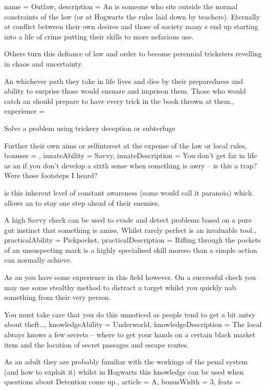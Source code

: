 \archetype
{
	name = Outlaw,
	description = An \bname{} is someone who sits outside the normal constraints of the law (or \comma{} at Hogwarts\comma{} the rules laid down by teachers). Eternally at conflict between their own desires and those of society\comma{} many \bname{}s end up starting into a life of crime\comma{} putting their skills to more nefarious use. 

Others turn this defiance of law and order to become perennial tricksters\comma{} revelling in chaos and uncertainty. 

An \bname{}\comma{} whichever path they take in life\comma{} lives and dies by their preparedness and ability to surprise those would ensnare and imprison them. Those who would catch an \bname{} should prepare to have every trick in the book thrown at them.,
	experience = \item Solve a problem using trickery\comma{} deception or subterfuge
\item Further their own aims or self\minus{}interest at the expense of the law or local rules,
	bonuses = 
,
	innateAbility = Savvy,
	innateDescription = You don’t get far in life as an \bname{} if you don’t develop a sixth sense when something is awry – is this a trap? Were those footsteps I heard? 

 is this inherent level of constant awareness (some would call it paranoia)\comma{} which allows an \bname{} to stay one step ahead of their enemies. 

A high Savvy check can be used to evade and detect problems based on a pure gut instinct that something is amiss. Whilst rarely perfect\comma{}  is an invaluable tool.,
	practicalAbility = Pickpocket,
	practicalDescription = Rifling through the pockets of an unsuspecting mark is a highly specialised skill\comma{} moreso than a simple  action can normally achieve. 

As an \bname{}\comma{} you have some experience in this field however. On a successful  check you may use some stealthy method to distract a target whilst you quickly nab something from their very person. 

You must take care that you do this unnoticed\comma{} as people tend to get a bit antsy about theft…,
	knowledgeAbility = Underworld,
	knowledgeDescription = The local \bname{} always knows a few secrets – where to get your hands on a certain black market item\comma{} and the location of secret passages and escape routes. 

As an adult\comma{} they are probably familiar with the workings of the penal system (and how to exploit it)\comma{} whilst in Hogwarts\comma{} this knowledge can be used when questions about Detention come up.,
	article = A,
	bonusWidth = 3, feats = \OutlawFeats
}

